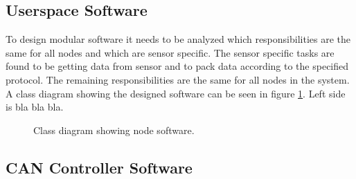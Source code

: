 \subsection{Userspace Software}
To design modular software it needs to be analyzed which responsibilities are the same for all nodes and which are sensor specific.
The sensor specific tasks are found to be getting data from sensor and to pack data according to the specified protocol.
The remaining responsibilities are the same for all nodes in the system. 
A class diagram showing the designed software can be seen in figure \ref{fig:node_class_diagram}.
Left side is bla bla bla.

\begin{figure}[!h]
\centering
{}
\caption{Class diagram showing node software.}
\label{fig:node_class_diagram}
\end{figure}


\subsection{CAN Controller Software}
